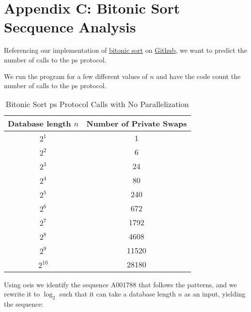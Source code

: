 \section*{Appendix C: Bitonic Sort Secquence Analysis}
\label{apx:bitonicsortanalysis}

Referencing our implementation of \href{https://github.com/BenjaminHansenMortensen/PrivateDatabaseSearch/blob/main/src/application/Client/Utilities/bitonic_sort.py}{bitonic sort} on \href{https://github.com/BenjaminHansenMortensen/PrivateDatabaseSearch}{Github}, we want to predict the number of calls to the \acrshort{ps} protocol.

We run the program for a few different values of $ n $ and have the code count the number of calls to the \acrshort{ps} protocol.

\begin{center}
    \begin{table}[H]
        \centering
        \begin{threeparttable}
            \begin{tabular}{|c | c|} 
            \hline
            Database length $ n $ & Number of Private Swaps \\ [0.5ex] 
            \hline\hline
             $ 2^1 $ & 1 \\
             $ 2^2 $ & 6 \\
             $ 2^3 $ & 24 \\
             $ 2^4 $ & 80 \\
             $ 2^5 $ & 240 \\
             $ 2^6 $ & 672 \\
             $ 2^7 $ & 1792 \\
             $ 2^8 $ & 4608 \\
             $ 2^9 $ & 11520 \\
             $ 2^{10} $ & 28180 \\
            [1ex]
            \hline
            \end{tabular}
            \caption{Bitonic Sort \acrshort{ps} Protocol Calls with No Parallelization}
            \label{tab:bitonicsortSequence}
        \end{threeparttable}
    \end{table}
\end{center}

Using \acrfull{oeis} \cite{Sloane_1964} we identify the sequence A001788 that follows the patterns, and we rewrite it to $ \log_2 $ such that it can take a database length $ n $ as an input, yielding the sequence:

